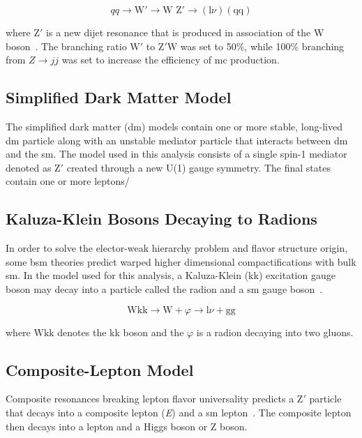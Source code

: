 \begin{equation}\label{eq:6.1}
	qq \rightarrow \textrm{W}' \rightarrow \textrm{W Z}' \rightarrow (\textrm{l}\nu)(\textrm{qq})
\tag{6.1}
\end{equation}

where $\textrm{Z}'$ is a new dijet resonance that is produced in association of the W boson~\cite{Zp}. The branching ratio $\textrm{W}'$ to $\textrm{Z}'\textrm{W}$ was set to 50\%, 
while 100\% branching from $Z\to jj$ was set to increase the efficiency of \gls{mc} production. 

\subsection{Simplified Dark Matter Model}

The simplified dark matter (\gls{dm}) models contain one or more stable, long-lived \gls{dm} particle along with an unstable mediator particle that interacts between \gls{dm} and 
the \gls{sm}. The model used in this analysis consists of a single spin-1 mediator denoted as $\textrm{Z}'$ created through a new U(1) gauge symmetry. The final states contain 
one or more leptons/

\subsection{Kaluza-Klein Bosons Decaying to Radions}

In order to solve the elector-weak hierarchy problem and flavor structure origin, some \gls{bsm} theories predict warped higher dimensional compactifications with bulk \gls{sm}. 
In the model used for this analysis, a Kaluza-Klein (\gls{kk}) excitation gauge boson may decay into a particle called the radion and a \gls{sm} gauge boson~\cite{wkk1,wkk2}. 

\begin{equation}\label{eq:6.2}
\textrm{Wkk} \to \textrm{W} + \varphi \to \textrm{l}\nu + \textrm{gg}  
\tag{6.2}
\end{equation}

where $\textrm{Wkk}$ denotes the \gls{kk} boson and the $\varphi$ is a radion decaying into two gluons. 

\subsection{Composite-Lepton Model}

Composite resonances breaking lepton flavor universality predicts a $\textrm{Z}'$ particle that decays into a composite lepton (\textit{E}) and a \gls{sm} lepton~\cite{comp-lep}. The 
composite lepton then decays into a lepton and a Higgs boson or Z boson. 

